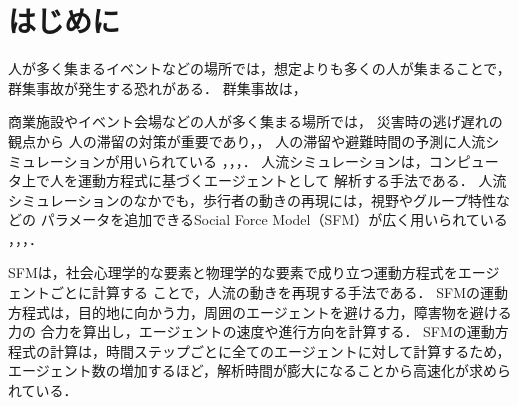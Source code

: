 \chapter{はじめに}
\label{sec:intro}
人が多く集まるイベントなどの場所では，想定よりも多くの人が集まることで，
群集事故が発生する恐れがある．
群集事故は，


商業施設やイベント会場などの人が多く集まる場所では，
災害時の逃げ遅れの観点から
人の滞留の対策が重要であり\cite{taisaku1}，\cite{taisaku2}，
人の滞留や避難時間の予測に人流シミュレーションが用いられている
\cite{sim_jirei1}，\cite{sim_jirei2}，\cite{sim_jirei3}，\cite{sim_jirei8}．
人流シミュレーションは，コンピュータ上で人を運動方程式に基づくエージェントとして
解析する手法である．
人流シミュレーションのなかでも，歩行者の動きの再現には，視野やグループ特性などの
パラメータを追加できるSocial Force Model（SFM）が広く用いられている
\cite{helbing_sfm}，\cite{sfm_ntt}，\cite{sfm_para1}，\cite{intro_gunshu}．

SFMは，社会心理学的な要素と物理学的な要素で成り立つ運動方程式をエージェントごとに計算する
ことで，人流の動きを再現する手法である．
SFMの運動方程式は，目的地に向かう力，周囲のエージェントを避ける力，障害物を避ける力の
合力を算出し，エージェントの速度や進行方向を計算する．
SFMの運動方程式の計算は，時間ステップごとに全てのエージェントに対して計算するため，
エージェント数の増加するほど，解析時間が膨大になることから高速化が求められている．

